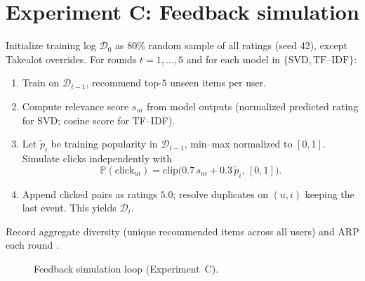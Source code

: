 \documentclass[11pt,a4paper,twoside,openright]{report}
\begin{document}
\section{Experiment C: Feedback simulation}
Initialize training log $\mathcal{D}_0$ as 80\% random sample of all ratings (seed 42), except Takealot overrides. For rounds $t=1,\ldots,5$ and for each model in $\{\text{SVD}, \text{TF--IDF}\}$:
\begin{enumerate}
  \item Train on $\mathcal{D}_{t-1}$, recommend top-$5$ unseen items per user.
  \item Compute relevance score $s_{ui}$ from model outputs (normalized predicted rating for SVD; cosine score for TF--IDF).
  \item Let $\tilde{p}_i$ be training popularity in $\mathcal{D}_{t-1}$, min--max normalized to $[0,1]$. Simulate clicks independently with
  \begin{equation}
    \mathbb{P}(\text{click}_{ui}) = \mathrm{clip}\bigl( 0.7\, s_{ui} + 0.3\, \tilde{p}_i,\, [0,1] \bigr).
  \end{equation}
  \item Append clicked pairs as ratings $5.0$; resolve duplicates on $(u,i)$ keeping the last event. This yields $\mathcal{D}_t$.
\end{enumerate}
Record aggregate diversity (unique recommended items across all users) and ARP each round \citep{chaney2018algorithmic,mansoury2020feedback}.

\begin{figure}[htbp]
  \centering
  \caption{Feedback simulation loop (Experiment~C).}
  \label{fig:feedback}
\end{figure}
\end{document}

